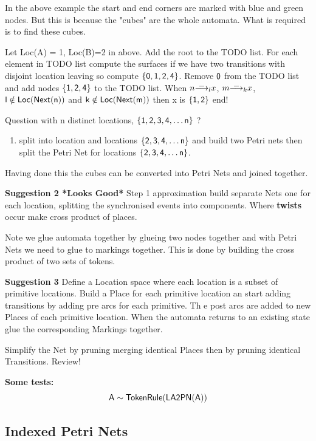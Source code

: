 \documentclass[]{article}
\begin{document}
{In the above example the start and end corners are marked with blue and green nodes. But this is because the "cubes" are the whole automata. What is required is to find these cubes.

 Let {\sf Loc(A) = 1, Loc(B)=2} in above.   Add the root {} to the TODO list. For each element in TODO list compute the surfaces if  we have  two transitions with disjoint location leaving  so compute $\sf \{0,1,2,4\}$. Remove $\sf 0$ from the TODO list and add nodes ${\sf \{1,2,4\}}$ to the TODO list.  When
$\arop{n}{\_}{x}{l}$,  $\arop{m}{\_}{x}{k}$, ${\sf  l \notin Loc(Next(n))}$ and ${\sf  k \notin Loc(Next(m))}$ then {\sf x} is ${\sf \{1,2\}}$ end!

Question with {\sf n} distinct locations, $\sf \{1,2,3,4,\ldots n\}$ ?
\begin{enumerate}
\item split into location {} and locations $\sf \{2,3,4,\ldots n\}$ and build two Petri nets then split the Petri Net for locations $\sf \{2,3,4,\ldots n\}$.
\end{enumerate}
Having done this the cubes can be converted into Petri Nets and joined together.

{\bf Suggestion 2 *Looks Good*} Step 1 approximation build separate Nets one for each location, splitting the  synchronised events into components. Where {\bf twists} occur make cross product of places.

Note we glue automata together by glueing two nodes together and with Petri Nets we need to glue to markings together. This is done by building the cross product of  two sets of tokens.

{\bf Suggestion 3}   Define a Location space where each location is a subset of primitive locations. Build a Place for each primitive location an start adding transitions by adding pre arcs for each primitive. Th e post arcs are added to new Places of each primitive  location. When the automata returns to an existing state  glue the corresponding Markings together.

Simplify the Net  by pruning merging identical Places then by pruning identical Transitions.  Review!

{\bf Some  tests:}
\[{\sf A\sim  TokenRule(LA2PN(A))}\]

\subsection{Indexed Petri Nets}

}
\end{document}
